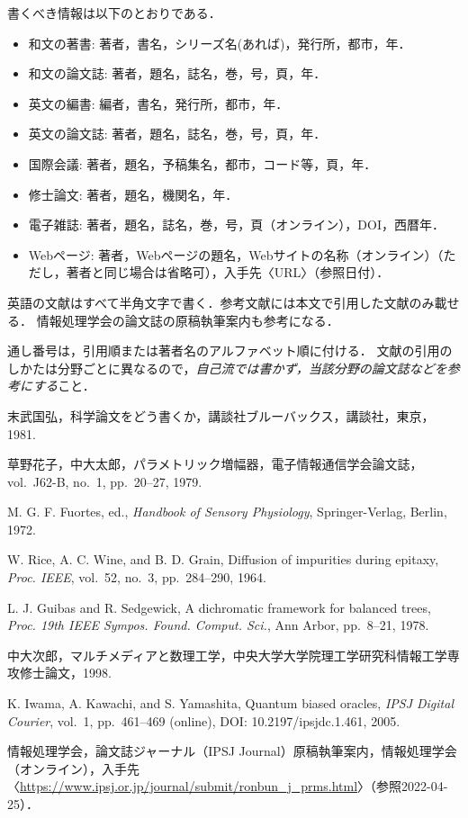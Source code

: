 \documentclass[uplatex,dvipdfmx,10pt,a4paper,notitlepage,oneside,twocolumn]{abst_jsarticle}
\begin{document}
書くべき情報は以下のとおりである．
\begin{itemize}
\item 和文の著書: 著者，書名，シリーズ名(あれば)，発行所，都市，年．
\item 和文の論文誌: 著者，題名，誌名，巻，号，頁，年．
\item 英文の編書: 編者，書名，発行所，都市，年．
\item 英文の論文誌: 著者，題名，誌名，巻，号，頁，年．
\item 国際会議: 著者，題名，予稿集名，都市，コード等，頁，年．
\item 修士論文: 著者，題名，機関名，年．
\item 電子雑誌: 著者，題名，誌名，巻，号，頁（オンライン），DOI，西暦年．
\item Webページ: 著者，Webページの題名，Webサイトの名称（オンライン）（ただし，著者と同じ場合は省略可），入手先〈URL〉（参照日付）．
\end{itemize}
英語の文献はすべて半角文字で書く．参考文献には本文で引用した文献のみ載せる．
情報処理学会の論文誌の原稿執筆案内\cite{IPSJ}も参考になる．

通し番号は，引用順または著者名のアルファベット順に付ける．
文献の引用のしかたは分野ごとに異なるので，{\em 自己流では書かず，当該分野の論文誌などを参考にする}こと．


\begin{thebibliography}{99}

末武国弘，科学論文をどう書くか，講談社ブルーバックス，講談社，東京，1981. 

草野花子，中大太郎，パラメトリック増幅器，電子情報通信学会論文誌，vol.~J62-B, no.~1, pp.~20--27, 1979. 

M. G. F. Fuortes, ed., \textit{Handbook of Sensory Physiology}, Springer-Verlag, Berlin, 1972.

W. Rice, A. C. Wine, and B. D. Grain, Diffusion of impurities during epitaxy, \textit{Proc. IEEE}, vol.~52, no.~3, pp.~284--290, 1964.

L. J. Guibas and R. Sedgewick, A dichromatic framework for balanced trees, 
\textit{Proc. 19th IEEE Sympos. Found. Comput. Sci.}, Ann Arbor, pp.~8--21, 1978.

中大次郎，マルチメディアと数理工学，中央大学大学院理工学研究科情報工学専攻修士論文，1998.

K. Iwama, A. Kawachi, and S. Yamashita, Quantum biased oracles, \textit{IPSJ Digital Courier}, vol.~1, pp.~461--469 (online), DOI: 10.2197/ipsjdc.1.461, 2005.

情報処理学会，論文誌ジャーナル（IPSJ Journal）原稿執筆案内，情報処理学会（オンライン），入手先〈\url{https://www.ipsj.or.jp/journal/submit/ronbun_j_prms.html}〉（参照2022-04-25）．



\end{thebibliography}
\end{document}

